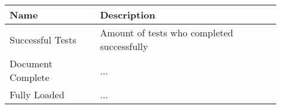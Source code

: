 \begin{center}
	\small
	\begin{longtable}{ p{0.3\linewidth} | p{0.6\linewidth} }
	Name & Description \\ 
	\hline
	Successful Tests & Amount of tests who completed successfully  \\
	
	Document Complete & ...  \\ %
	
	Fully Loaded & ...  \\ %
	

\end{longtable}
\end{center}
